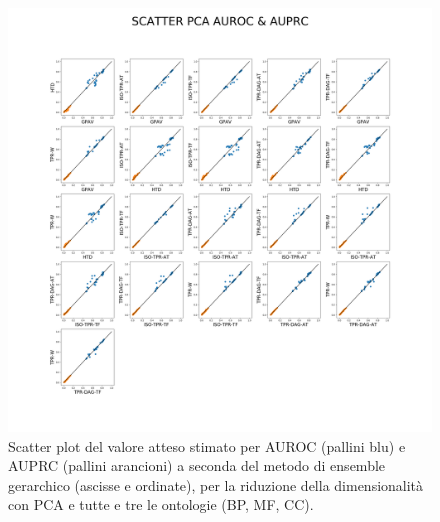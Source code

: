 \documentclass[12pt]{report}
\begin{document}
\begin{figure}
 \hspace*{-2.6cm}
\includegraphics[scale=0.3]{./images/scatterplot_PCA.png}
\caption{\footnotesize{Scatter plot del valore atteso stimato per AUROC (pallini blu) e AUPRC (pallini arancioni) a seconda del metodo di ensemble gerarchico (ascisse e ordinate), per la riduzione della dimensionalità con PCA e tutte e tre le ontologie (BP, MF, CC).}}
\label{scatter_2}
\end{figure}
\end{document}
